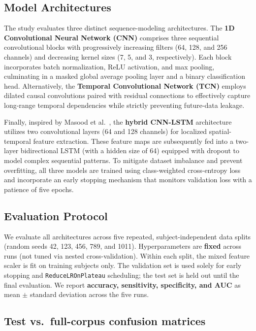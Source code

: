 \documentclass{article}
\begin{document}
\subsection{Model Architectures}

The study evaluates three distinct sequence-modeling architectures. The \textbf{1D Convolutional Neural Network (CNN)} comprises three sequential convolutional blocks with progressively increasing filters (64, 128, and 256 channels) and decreasing kernel sizes (7, 5, and 3, respectively). Each block incorporates batch normalization, ReLU activation, and max pooling, culminating in a masked global average pooling layer and a binary classification head. Alternatively, the \textbf{Temporal Convolutional Network (TCN)} employs dilated causal convolutions paired with residual connections to effectively capture long-range temporal dependencies while strictly preventing future-data leakage.

Finally, inspired by Masood et al.~\cite{masood2023}, the \textbf{hybrid CNN-LSTM} architecture utilizes two convolutional layers (64 and 128 channels) for localized spatial-temporal feature extraction. These feature maps are subsequently fed into a two-layer bidirectional LSTM (with a hidden size of 64) equipped with dropout to model complex sequential patterns. To mitigate dataset imbalance and prevent overfitting, all three models are trained using class-weighted cross-entropy loss and incorporate an early stopping mechanism that monitors validation loss with a patience of five epochs.

\subsection{Evaluation Protocol}

We evaluate all architectures across five repeated, subject-independent data splits (random seeds 42, 123, 456, 789, and 1011). Hyperparameters are \textbf{fixed} across runs (not tuned via nested cross-validation). Within each split, the mixed feature scaler is fit on training subjects only. The validation set is used solely for early stopping and \texttt{ReduceLROnPlateau} scheduling; the test set is held out until the final evaluation. We report \textbf{accuracy, sensitivity, specificity, and AUC} as mean $\pm$ standard deviation across the five runs.

\subsection{Test vs.\ full-corpus confusion matrices}
\end{document}
